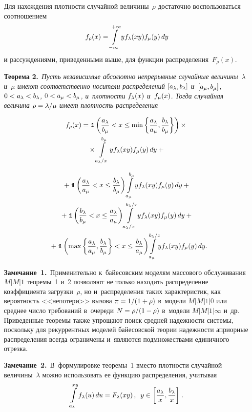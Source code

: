 \begin{multicols}{2}

Для нахождения плотности случайной величины~$\rho$ достаточно воспользоваться 
соотношением
$$
f_\rho(x)=\int\limits_{-\infty}^{+\infty}{y}f_\lambda(xy)f_\mu(y)\, dy
$$
и рассуждениями, приведенными выше, для функции распределения~$F_\rho(x)$.

\smallskip

\noindent
\textbf{Теорема 2.}\ \textit{Пусть независимые абсолютно непрерывные случайные 
величины~$\lambda$ и~$\mu$ имеют соответственно носители распределений 
$[a_\lambda,b_\lambda]$ и~$[a_\mu,b_\mu]$, $0\hm<\al\hm<\bll$, $0\hm<\am\hm<\bmm$, 
и~плот\-ности $f_\lambda(x)$ и~$f_\mu(x)$. Тогда случайная величина 
$\rho\hm=\lambda/\mu$ имеет плотность распределения}

\noindent
\begin{multline*}
f_\rho(x)=\mbox{{\small \tt {1}}\hspace{-1.3mm}{\tt 1}}\left(\displaystyle\frac{\displaystyle a_\lambda\mathstrut}{\displaystyle b_\mu\mathstrut}<x\le\min\left\{\frac{a_\lambda}{a_\mu},\displaystyle\frac{\displaystyle b_\lambda\mathstrut}{\displaystyle b_\mu\mathstrut}\right\}\right)\times{}\\
{}\times\int\limits_{a_\lambda/x}^{b_\mu}
{y}f_\lambda(xy)f_\mu(y)\, dy+{}
\end{multline*}

\noindent
\begin{multline*}
{}+\Ik\left(\fr{\al}{\am}<x\le\fr{\bll}{\bmm}\right)\il{\am}{\bmm}{y}\fl(xy)\fm(y)\, dy+{}\\
{}+\Ik\left(\fr{\bll}{\bmm}<x\le\fr{\al}{\am}\right)\il{\al/x}{\bll/x}{y}\fl(xy)\fm(y)\, dy +{}\\
{}+\Ik\left(\max\left\{\fr{\al}{\am},\fr{\bll}{\bmm}\right\}<x\le
\fr{\bll}{\am}\right)\!\!\il{\am}{\bll/x}\!\!{y}\fl(xy)\fm(y)\, dy.\hspace*{-5.39891pt}
\end{multline*}


\noindent
\textbf{Замечание~1.}\ Применительно к~байесовским моделям массового 
обслуживания $M|M|1$ теоремы~1 и~2 позволяют не только находить распределение 
коэффициента загрузки~$\rho$, но и~распределения таких характеристик, 
как вероятность <<непотери>> вызова 
$\pi\hm=1/(1\hm+\rho)$ в~модели $M|M|1|0$ или среднее чис\-ло требований 
в~очереди $N\hm=\rho/(1\hm-\rho)$ в~модели $M|M|1|\infty$ и~др. Приведенные 
теоремы также упрощают поиск средней надежности системы, поскольку 
для рекуррентных моделей байесовской тео\-рии надежности априорные 
распределения всегда ограничены и~являются подмножествами единичного отрезка.


\smallskip

\noindent
\textbf{Замечание~2.}\ В~формулировке теоремы~1 вместо плотности случайной 
величины~$\lambda$ можно использовать ее функцию распределения, учитывая
$$
\int\limits_{a_\lambda}^{xy}f_\lambda(u)\,du=F_\lambda(xy)\,,\enskip y\in\left[\displaystyle\frac{\displaystyle a_\lambda\mathstrut}{\displaystyle x\mathstrut},\displaystyle\frac{\displaystyle b_\lambda\mathstrut}{\displaystyle x\mathstrut}\right]\,.
$$





\end{multicols}
